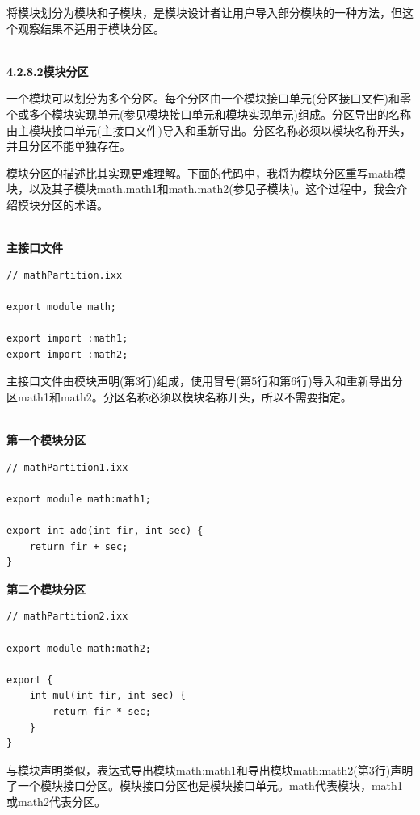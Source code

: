 将模块划分为模块和子模块，是模块设计者让用户导入部分模块的一种方法，但这个观察结果不适用于模块分区。

\hspace*{\fill} \\ %
\noindent
\textbf{4.2.8.2\hspace{0.2cm}模块分区}

一个模块可以划分为多个分区。每个分区由一个模块接口单元(分区接口文件)和零个或多个模块实现单元(参见模块接口单元和模块实现单元)组成。分区导出的名称由主模块接口单元(主接口文件)导入和重新导出。分区名称必须以模块名称开头，并且分区不能单独存在。

模块分区的描述比其实现更难理解。下面的代码中，我将为模块分区重写math模块，以及其子模块math.math1和math.math2(参见子模块)。这个过程中，我会介绍模块分区的术语。

\hspace*{\fill} \\ %
\noindent
\textbf{主接口文件}
\begin{lstlisting}[style=styleCXX]
// mathPartition.ixx

export module math;

export import :math1;
export import :math2;
\end{lstlisting}

主接口文件由模块声明(第3行)组成，使用冒号(第5行和第6行)导入和重新导出分区math1和math2。分区名称必须以模块名称开头，所以不需要指定。

\hspace*{\fill} \\ %
\noindent
\textbf{第一个模块分区}
\begin{lstlisting}[style=styleCXX]
// mathPartition1.ixx

export module math:math1;

export int add(int fir, int sec) {
	return fir + sec;
}
\end{lstlisting}

\noindent
\textbf{第二个模块分区}
\begin{lstlisting}[style=styleCXX]
// mathPartition2.ixx

export module math:math2;

export {
	int mul(int fir, int sec) {
		return fir * sec;
	}
}
\end{lstlisting}

与模块声明类似，表达式导出模块math:math1和导出模块math:math2(第3行)声明了一个模块接口分区。模块接口分区也是模块接口单元。math代表模块，math1或math2代表分区。

